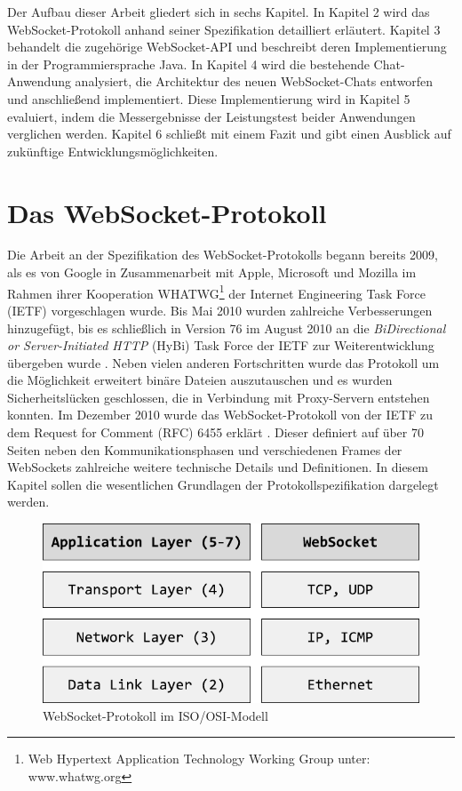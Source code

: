 \documentclass[11pt,a4paper,titlepage]{scrartcl}
\numberwithin{equation}{section}
\begin{document}
\noindent Der Aufbau dieser Arbeit gliedert sich in sechs Kapitel. In Kapitel 2 wird das WebSocket-Protokoll anhand seiner Spezifikation detailliert erläutert. Kapitel 3 behandelt die zugehörige WebSocket-API und beschreibt deren Implementierung in der Programmiersprache Java. In Kapitel 4 wird die bestehende Chat-Anwendung analysiert, die Architektur des neuen WebSocket-Chats entworfen und anschließend implementiert. Diese Implementierung wird in Kapitel 5 evaluiert, indem die Messergebnisse der Leistungstest beider Anwendungen verglichen werden. Kapitel 6 schließt mit einem Fazit und gibt einen Ausblick auf zukünftige Entwicklungsmöglichkeiten.

\newpage
\section{Das WebSocket-Protokoll}\label{sec:WebSocketProtokoll}
Die Arbeit an der Spezifikation des WebSocket-Protokolls begann bereits 2009, als es von Google in Zusammenarbeit mit Apple, Microsoft und Mozilla im Rahmen ihrer Kooperation WHATWG\footnote{Web Hypertext Application Technology Working Group unter: www.whatwg.org} der Internet Engineering Task Force (IETF) vorgeschlagen wurde. Bis Mai 2010 wurden zahlreiche Verbesserungen hinzugefügt, bis es schließlich in Version 76 \autocite{hickson_websocket_2010} im August 2010 an die \textit{BiDirectional or Server-Initiated HTTP} (HyBi) Task Force der IETF zur Weiterentwicklung übergeben wurde \autocite{fette_websocket_2010}. Neben vielen anderen Fortschritten wurde das Protokoll um die Möglichkeit erweitert binäre Dateien auszutauschen und es wurden Sicherheitslücken geschlossen, die in Verbindung mit Proxy-Servern entstehen konnten. Im Dezember 2010 wurde das WebSocket-Protokoll von der IETF zu dem Request for Comment (RFC) 6455 erklärt \autocite{fette_websocket_2011}. Dieser definiert auf über 70 Seiten neben den Kommunikationsphasen und verschiedenen Frames der WebSockets zahlreiche weitere technische Details und Definitionen. In diesem Kapitel sollen die wesentlichen Grundlagen der Protokollspezifikation dargelegt werden.\\
\begin{figure}[ht] \label{fig:wsOSI}
\begin{center}
	\includegraphics[scale=1]{img/osi.pdf}
	\caption{WebSocket-Protokoll im ISO/OSI-Modell}
\end{center}
\end{figure}
\end{document}
